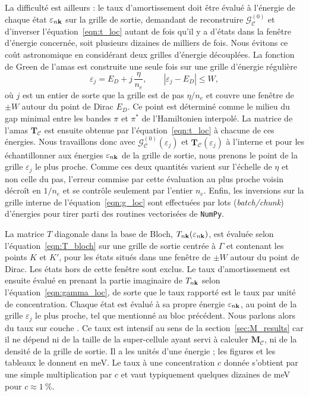 La difficulté est ailleurs : le taux d'amortissement doit être évalué à l'énergie de chaque état $\varepsilon_{n\mathbf{k}}$ sur la grille de sortie, demandant de reconstruire $\bm{\mathcal{G}}^{(0)}_\mathcal{C}$ et d'inverser l'équation~\eqref{eqn:t_loc} autant de fois qu'il y a d'états dans la fenêtre d'énergie concernée, soit plusieurs dizaines de milliers de fois. Nous évitons ce coût astronomique en considérant deux grilles d'énergie découplées. La fonction de Green de l'amas est construite une seule fois sur une grille d'énergie régulière
\begin{equation}
    \varepsilon_j = E_D + j\,\frac{\eta}{n_e},\qquad |\varepsilon_j-E_D|\le W,
\end{equation}
où $j$ est un entier de sorte que la grille est de pas $\eta/n_e$ et couvre une fenêtre de $\pm W$ autour du point de Dirac $E_D$. Ce point est déterminé comme le milieu du gap minimal entre les bandes $\pi$ et $\pi^*$ de l'Hamiltonien interpolé. La matrice de l'amas $\bm T_\mathcal{C}$ est ensuite obtenue par l'équation~\eqref{eqn:t_loc} à chacune de ces énergies. Nous travaillons donc avec $\bm{\mathcal{G}}^{(0)}_\mathcal{C}(\varepsilon_j)$ et $\bm T_\mathcal{C}(\varepsilon_j)$ à l'interne et pour les échantillonner aux énergies $\varepsilon_{n\mathbf{k}}$ de la grille de sortie, nous prenons le point de la grille $\varepsilon_j$ le plus proche. Comme ces deux quantités varient sur l'échelle de $\eta$ et non celle du pas, l'erreur commise par cette évaluation au plus proche voisin décroît en $1/n_e$ et se contrôle seulement par l'entier $n_e$. Enfin, les inversions sur la grille interne de l'équation~\eqref{eqn:g_loc} sont effectuées par lots (\textit{batch/chunk}) d'énergies pour tirer parti des routines vectorisées de \texttt{NumPy}.

\bigskip
{}

La matrice $T$ diagonale dans la base de Bloch, $T_{n\mathbf{k}}(\varepsilon_{n\mathbf{k}})$, est évaluée selon l'équation~\eqref{eqn:T_bloch} sur une grille de sortie centrée à $\Gamma$ et contenant les points $K$ et $K'$, pour les états situés dans une fenêtre de $\pm W$ autour du point de Dirac. Les états hors de cette fenêtre sont exclus. Le taux d'amortissement est ensuite évalué en prenant la partie imaginaire de $T_{n\mathbf{k}}$ selon l'équation~\eqref{eqn:gamma_loc}, de sorte que le taux rapporté est le taux par unité de concentration. Chaque état est évalué à sa propre énergie $\varepsilon_{n\mathbf{k}}$, au point de la grille $\varepsilon_j$ le plus proche, tel que mentionné au bloc précédent. Nous parlons alors du \og taux sur couche \fg{}. Ce taux est intensif au sens de la section~\ref{sec:M_results} car il ne dépend ni de la taille de la super-cellule ayant servi à calculer $\bm M_\mathcal{C}$, ni de la densité de la grille de sortie. Il a les unités d'une énergie ; les figures et les tableaux le donnent en meV. Le taux à une concentration $c$ donnée s'obtient par une simple multiplication par $c$ et vaut typiquement quelques dizaines de meV pour $c\approx 1~\%$.

